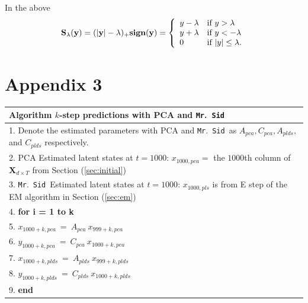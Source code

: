 \documentclass[fleqn]{article}
\let\oldref\ref
\renewcommand{\ref}[1]{(\oldref{#1})}
\newcommand{\mrsid}{{\sc \texttt{Mr}.~\texttt{Sid}}}
\begin{document}
\vspace*{10mm}
In the above
\[
\mathbf{S_\lambda (y) = (|y|-\lambda)_{+}\textbf{sign}(y)}=\left\{
\begin{array}{l l }
 y - \lambda & \text{if   } y > \lambda\\
 y + \lambda & \text{if   } y < -\lambda\\
 0 & \text{if   } |y| \leq \lambda .
\end{array}
\right.
\]

\section*{Appendix 3}
\label{sec:appendix3}
\begin{tabular}{l}
\hline
\textbf{Algorithm } $k$-step predictions with PCA and \mrsid\\
\hline
 1. Denote the estimated parameters with PCA and \mrsid~as $A_{pca},C_{pca},A_{plds},$ and $C_{plds}$ respectively.\\
 2. PCA Estimated latent states at $t=1000$: $x_{1000,pca} = $ the $1000$th column of $\mathbf{X}_{d\times T}$ from Section \oldref{sec:initial} \\
 3. \mrsid~Estimated latent states at $t=1000$: $x_{1000,pls}$ is from E step of the EM algorithm in Section \oldref{sec:em}\\
 4. \textbf{for i = 1 to k}\\
 5. \hspace{10mm}		$x_{1000+k,pca}\ =\ A_{pca}\ x_{999+k,pca}$\\
 6.	\hspace{10mm}	$y_{1000+k,pca}\ =\ C_{pca}\ x_{1000+k,pca}$\\
 7.	\hspace{10mm}	$x_{1000+k,plds}\ =\ A_{plds}\ x_{999+k,plds}$\\
 8.	\hspace{10mm}	$y_{1000+k,plds}\ =\ C_{plds}\ x_{1000+k,plds}$\\
 9. \textbf{end}\\
\hline
\end{tabular}
\end{document}
